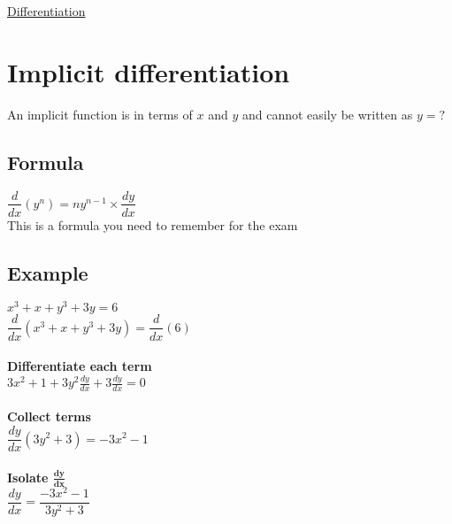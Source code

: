 \documentclass{article}[18pt]
\begin{document}
\begin{center}
\underline{\huge Differentiation}
\end{center}
\section{Implicit differentiation}
An implicit function is in terms of $x$ and $y$ and cannot easily be written as $y=?$
\subsection{Formula}
$\dfrac{d}{dx}(y^n)=ny^{n-1}\times\dfrac{dy}{dx}$\\
This is a formula you need to remember for the exam
\subsection{Example}
$x^3+x+y^3+3y=6$\\
$\dfrac{d}{dx}(x^3+x+y^3+3y)=\dfrac{d}{dx}(6)$\\
\\
\textbf{Differentiate each term}\\
$3x^2+1+3y^2\frac{dy}{dx}+3\frac{dy}{dx}=0$\\
\\
\textbf{Collect terms}\\
$\dfrac{dy}{dx}(3y^2+3)=-3x^2-1$\\
\\
\textbf{Isolate $\mathbf{\frac{dy}{dx}}$}\\
$\dfrac{dy}{dx}=\dfrac{-3x^2-1}{3y^2+3}$
\\
\end{document}
